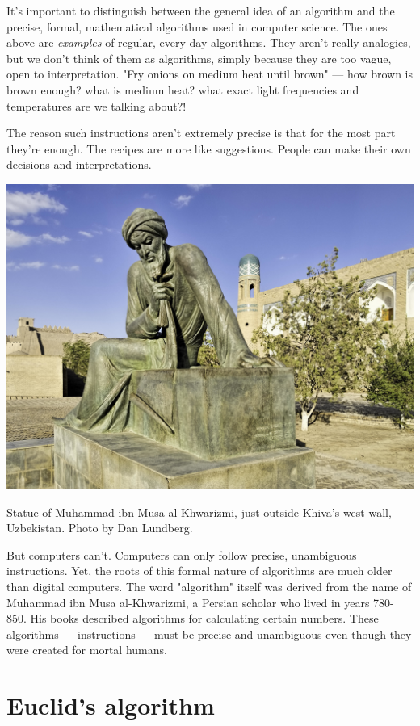 \documentclass[a4paper, justified, notitlepage, sfsidenotes, notoc]{tufte-book}
\begin{document}
It's important to distinguish between the general idea of an algorithm and the precise, formal, mathematical algorithms used in computer science. The ones above are \emph{examples} of regular, every-day algorithms. They aren't really analogies, but we don't think of them as algorithms, simply because they are too vague, open to interpretation. "Fry onions on medium heat until brown" — how brown is brown enough? what is medium heat? what exact light frequencies and temperatures are we talking about?!

The reason such instructions aren't extremely precise is that for the most part they're enough. The recipes are more like suggestions. People can make their own decisions and interpretations.

\begin{marginfigure}
  \includegraphics[width=\linewidth]{images/Muhammad ibn Musa al-Khwarizmi.jpg}
  \caption{Statue of Muhammad ibn Musa al-Khwarizmi, just outside Khiva’s west wall, Uzbekistan. Photo by Dan Lundberg.}
  \label{fig:marginfig}
\end{marginfigure}

But computers can't. Computers can only follow precise, unambiguous instructions. Yet, the roots of this formal nature of algorithms are much older than digital computers. The word "algorithm" itself was derived from the name of Muhammad ibn Musa al-Khwarizmi, a Persian scholar who lived in years 780-850. His books described algorithms for calculating certain numbers. These algorithms — instructions — must be precise and unambiguous even though they were created for mortal humans.
\chapter{Euclid's algorithm}
\label{sec:org3a0026c}
\end{document}
